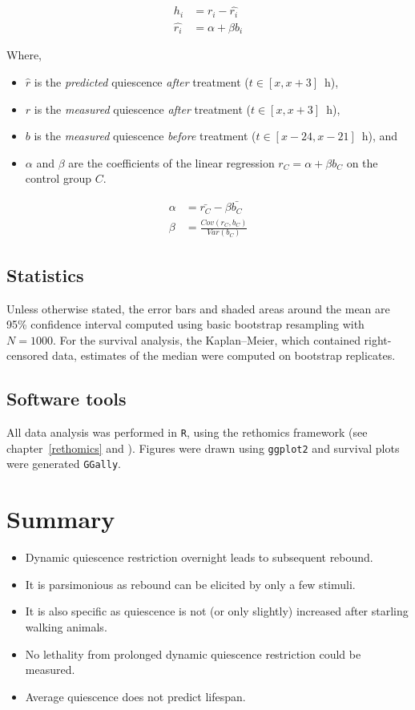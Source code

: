 \begin{align}
h_i &=  r_i - \hat{r_i} \\
\hat{r_i} &= \alpha + \beta{} b_i
\end{align}


Where,
\begin{itemize}
	\item $\hat{r}$ is the \emph{predicted} quiescence  \emph{after} treatment ($t \in [x,x+3]$~h),
	\item $r$ is the \emph{measured} quiescence  \emph{after} treatment ($t \in [x,x+3]$~h),
	\item $b$ is the \emph{measured} quiescence \emph{before} treatment  ($t \in [x - 24 ,x-21]$~h), and
	\item $\alpha$ and $\beta$ are the coefficients of the linear regression $r_C = \alpha + \beta{b_C}$ on the control group $C$.
\end{itemize}

\begin{align}
\alpha &=  \bar{r_C} - \beta\bar{b_C} \\
\beta &= \frac{Cov(r_C, b_C)}{Var(b_C)}
\end{align}

\subsection{Statistics}
Unless otherwise stated, the error bars and shaded areas around the mean are 95\% confidence interval computed using basic bootstrap resampling\cite{efron_bootstrap_1992} with $N=1000$.
For the survival analysis, the Kaplan–Meier, which contained right-censored data, estimates of the median were computed on bootstrap replicates.

\subsection{Software tools}
All data analysis was performed in \texttt{R}\cite{r_core_team_r_2017}, using the rethomics framework (see chapter~\ref{rethomics} and \cite{geissmann_rethomics_2018}).
Figures were drawn using \texttt{ggplot2} \cite{wickham_ggplot2_2016} and survival plots were generated \texttt{GGally}\cite{schloerke_ggally_2018}.

\newpage
\section{Summary}

\begin{itemize}
	\item Dynamic quiescence restriction overnight leads to subsequent rebound.
	\item It is parsimonious as rebound can be elicited by only a few stimuli.
	\item It is also specific as quiescence is not (or only slightly) increased after starling walking animals.
	\item No lethality from prolonged dynamic quiescence restriction could be measured.
	\item Average quiescence does not predict lifespan.
\end{itemize}

